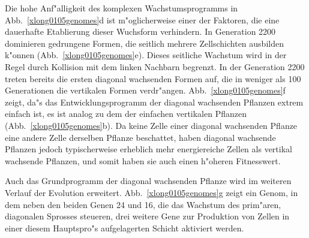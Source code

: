 Die hohe Anf"alligkeit des komplexen Wachstumsprogramms in Abb.\ \ref{xlong0105genomes}d ist m"oglicherweise
einer der Faktoren, die eine dauerhafte Etablierung dieser Wuchsform verhindern. In Generation 2200
dominieren gedrungene Formen, die seitlich mehrere Zellschichten ausbilden k"onnen
(Abb.\ \ref{xlong0105genomes}e). Dieses seitliche Wachstum wird in der Regel durch Kollision mit dem
linken Nachbarn begrenzt. In der Generation 2200 treten bereits die ersten diagonal wachsenden
Formen auf, die in weniger als 100 Generationen die vertikalen Formen verdr"angen. Abb.\ \ref{xlong0105genomes}f
zeigt, da"s das Entwicklungsprogramm der diagonal wachsenden Pflanzen extrem einfach ist, es ist analog
zu dem der einfachen vertikalen Pflanzen (Abb.\ \ref{xlong0105genomes}b). Da keine Zelle einer diagonal
wachsenden Pflanze eine andere Zelle derselben Pflanze beschattet, haben diagonal wachsende Pflanzen jedoch
typischerweise erheblich mehr energiereiche Zellen als vertikal wachsende Pflanzen, und somit haben sie
auch einen h"oheren Fitnesswert.

Auch das Grundprogramm der diagonal wachsenden Pflanze wird im weiteren Verlauf der Evolution erweitert.
Abb.\ \ref{xlong0105genomes}g zeigt ein Genom, in dem neben den beiden Genen 24 und 16, die das Wachstum
des prim"aren, diagonalen Sprosses steueren, drei weitere Gene zur Produktion von Zellen in einer diesem
Hauptspro"s aufgelagerten Schicht aktiviert werden.

